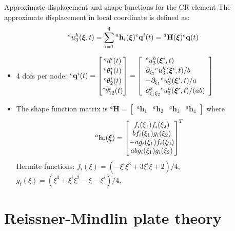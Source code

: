 \documentclass[aspectratio=169]{beamer}
\begin{document}
{  \begin{frame}{Approximate displacement and shape functions for the CR element}
    The approximate displacement in local coordinate is defined as:
    {\small$$  {}^eu_3^h(\boldsymbol\xi,t) =\sum_{i=1}^4  {}^a\mathbf h_i(\boldsymbol\xi) {}^e\mathbf  q^i(t)= {}^a\mathbf{H}(\boldsymbol\xi){}^e\mathbf{q}(t)$$}
    \begin{itemize}
      \item  4 dofs per node: {\small${}^e\mathbf  q^i(t)=\begin{bmatrix}
                {}^ed^i(t) \\[2pt] {}^e{\theta}^i_1(t) \\[2pt] {}^e{\theta}^i_2(t) \\[2pt] {}^e{\theta}^i_{12}(t)
              \end{bmatrix}=\left[\begin{array}{lll}
                  {}^eu_3^h(\boldsymbol\xi^i,t) \\[2pt] \partial_{\xi_2}{}^eu_3^h(\boldsymbol\xi^i,t)/b \\[2pt] -\partial_{\xi_1}{}^eu_3^h(\boldsymbol\xi^i,t)/a \\[2pt] \partial^2_{\xi_1\xi_2}{}^eu_3^h(\boldsymbol\xi^i,t)/(ab)
                \end{array}\right]$} \vspace{0.3cm}
      \item The shape function matrix is ${}^a\mathbf H=\begin{bmatrix}
                {}^a \mathbf h_1 & {}^a\mathbf  h_2 & {}^a \mathbf h_3 & {}^a\mathbf  h_4
              \end{bmatrix}$ where
              {\small$$ {}^a\mathbf  h_i(\boldsymbol\xi) =\begin{bmatrix}
                    f_i(\xi_1)f_i(\xi_2)     \\
                    bf_i(\xi_1)g_i(\xi_2 )   \\
                    -a g_i(\xi_1)f_i(\xi_2 ) \\
                    ab g_i(\xi_1)g_i(\xi_2 )
                  \end{bmatrix}^T$$}
            Hermite functions: $f_i(\xi)=(-\xi^i\xi^3+3\xi^i\xi+2)/4$, $g_i(\xi)=(\xi^3+\xi^i\xi^2-\xi-\xi^i)/4$.
    \end{itemize}
  \end{frame}
 }


\section{Reissner-Mindlin plate theory}
\end{document}
